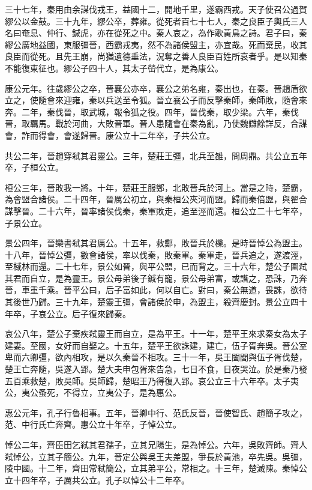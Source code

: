 三十七年，秦用由余謀伐戎王，益國十二，開地千里，遂霸西戎。天子使召公過賀繆公以金鼓。三十九年，繆公卒，葬雍。從死者百七十七人，秦之良臣子輿氏三人名曰奄息、仲行、鍼虎，亦在從死之中。秦人哀之，為作歌黃鳥之詩。君子曰，秦繆公廣地益國，東服彊晉，西霸戎夷，然不為諸侯盟主，亦宜哉。死而棄民，收其良臣而從死。且先王崩，尚猶遺德垂法，況奪之善人良臣百姓所哀者乎。是以知秦不能復東征也。繆公子四十人，其太子嵤代立，是為康公。

康公元年。往歲繆公之卒，晉襄公亦卒，襄公之弟名雍，秦出也，在秦。晉趙盾欲立之，使隨會來迎雍，秦以兵送至令狐。晉立襄公子而反擊秦師，秦師敗，隨會來奔。二年，秦伐晉，取武城，報令狐之役。四年，晉伐秦，取少梁。六年，秦伐晉，取羈馬。戰於河曲，大敗晉軍。晉人患隨會在秦為亂，乃使魏讎餘詳反，合謀會，詐而得會，會遂歸晉。康公立十二年卒，子共公立。

共公二年，晉趙穿弒其君靈公。三年，楚莊王彊，北兵至雒，問周鼎。共公立五年卒，子桓公立。

桓公三年，晉敗我一將。十年，楚莊王服鄭，北敗晉兵於河上。當是之時，楚霸，為會盟合諸侯。二十四年，晉厲公初立，與秦桓公夾河而盟。歸而秦倍盟，與翟合謀擊晉。二十六年，晉率諸侯伐秦，秦軍敗走，追至涇而還。桓公立二十七年卒，子景公立。

景公四年，晉欒書弒其君厲公。十五年，救鄭，敗晉兵於櫟。是時晉悼公為盟主。十八年，晉悼公彊，數會諸侯，率以伐秦，敗秦軍。秦軍走，晉兵追之，遂渡涇，至棫林而還。二十七年，景公如晉，與平公盟，已而背之。三十六年，楚公子圍弒其君而自立，是為靈王。景公母弟後子鍼有寵，景公母弟富，或譖之，恐誅，乃奔晉，車重千乘。晉平公曰，后子富如此，何以自亡。對曰，秦公無道，畏誅，欲待其後世乃歸。三十九年，楚靈王彊，會諸侯於申，為盟主，殺齊慶封。景公立四十年卒，子哀公立。后子復來歸秦。

哀公八年，楚公子棄疾弒靈王而自立，是為平王。十一年，楚平王來求秦女為太子建妻。至國，女好而自娶之。十五年，楚平王欲誅建，建亡，伍子胥奔吳。晉公室卑而六卿彊，欲內相攻，是以久秦晉不相攻。三十一年，吳王闔閭與伍子胥伐楚，楚王亡奔隨，吳遂入郢。楚大夫申包胥來告急，七日不食，日夜哭泣。於是秦乃發五百乘救楚，敗吳師。吳師歸，楚昭王乃得復入郢。哀公立三十六年卒。太子夷公，夷公蚤死，不得立，立夷公子，是為惠公。

惠公元年，孔子行魯相事。五年，晉卿中行、范氏反晉，晉使智氏、趙簡子攻之，范、中行氏亡奔齊。惠公立十年卒，子悼公立。

悼公二年，齊臣田乞弒其君孺子，立其兄陽生，是為悼公。六年，吳敗齊師。齊人弒悼公，立其子簡公。九年，晉定公與吳王夫差盟，爭長於黃池，卒先吳。吳彊，陵中國。十二年，齊田常弒簡公，立其弟平公，常相之。十三年，楚滅陳。秦悼公立十四年卒，子厲共公立。孔子以悼公十二年卒。

